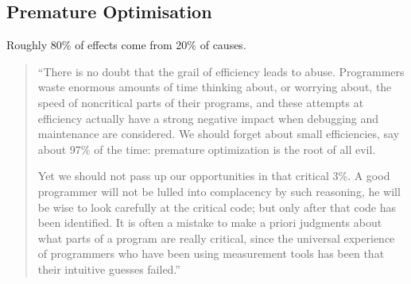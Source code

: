 \documentclass{article}
\newenvironment{aside}[1][]
  {\begin{mdframed}[style=0,%
      leftline=false,rightline=false,leftmargin=2em,rightmargin=2em,%
          innerleftmargin=0pt,innerrightmargin=0pt,linewidth=0.75pt,%
      skipabove=7pt,skipbelow=7pt,#1]\small}
  {\end{mdframed}}
\begin{document}
\subsection{Premature Optimisation}
\begin{aside}
    Roughly 80\% of effects come from 20\% of causes.

\end{aside}
\begin{quote}
    ``There is no doubt that the grail of efficiency leads to abuse.
    Programmers waste enormous amounts of time thinking about, or worrying
    about, the speed of noncritical parts of their programs, and these
    attempts at efficiency actually have a strong negative impact when
    debugging and maintenance are considered. We should forget about small
    efficiencies, say about 97\% of the time: premature optimization is the
    root of all evil.

    Yet we should not pass up our opportunities in that critical 3\%. A good
    programmer will not be lulled into complacency by such reasoning, he
    will be wise to look carefully at the critical code; but only after that
    code has been identified. It is often a mistake to make a priori
    judgments about what parts of a program are really critical, since the
    universal experience of programmers who have been using measurement
    tools has been that their intuitive guesses failed.''

\end{quote}
\end{document}
